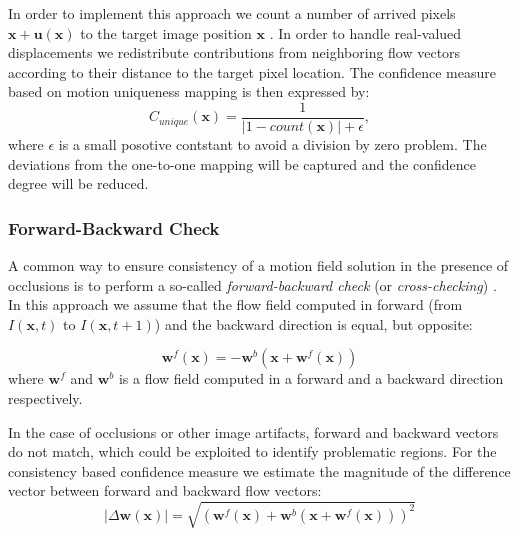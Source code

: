 In order to implement this approach we count a number of arrived pixels $\textbf{x}+\textbf{u}(\textbf{x})$  to the target image position $\textbf{x}$ . In order to handle real-valued displacements we redistribute contributions from neighboring flow vectors according to their distance to the target pixel location. The confidence measure based on motion uniqueness mapping is then expressed by:
$$ C_{unique}(\textbf{x}) = \frac{1}{|1 - count(\textbf{x})| + \epsilon}, $$
where $\epsilon$ is a small posotive contstant to avoid a division by zero problem.
The deviations from the one-to-one mapping will be captured and the confidence degree will be reduced.


        
\subsubsection{Forward-Backward Check}
\label{forward_backward_check}

A common way to ensure consistency of a motion field solution in the presence of occlusions is to perform a so-called \textit{forward-backward check} (or \textit{cross-checking}) \cite{Chang91, Fua93, Brown03}. In this approach we assume that the flow field computed in forward (from  $I(\textbf{x}, t)$ to $I(\textbf{x}, t+1)$) and the backward direction is equal, but opposite:


$$ \textbf{w}^{f}(\textbf{x}) = - \textbf{w}^{b}(\textbf{x} + \textbf{w}^{f}(\textbf{x}))$$   
where $\textbf{w}^{f}$ and $\textbf{w}^{b}$ is a flow field computed in a forward and a backward direction respectively.

In the case of occlusions or other image artifacts, forward and backward vectors do not match, which could be exploited to identify problematic regions. For the consistency based confidence measure we estimate the magnitude of the difference vector between forward and backward flow vectors:
$$ |\Delta \textbf{w}(\textbf{x})| = \sqrt { \left ( \textbf{w}^{f}(\textbf{x}) + \textbf{w}^{b}(\textbf{x} + \textbf{w}^{f}(\textbf{x})) \right )^2  }$$


